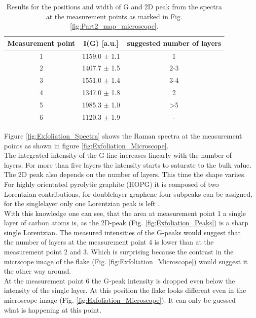\documentclass[12pt,a4paper]{article}
\begin{document}
\begin{table}[h]
\centering
\begin{tabular}{|c|c|c|}
\hline 
Measurement point & I(G) [a.u.] & suggested number of layers \\ 
\hline 
1 & 1159.0 $\pm$ 1.1 & 1 \\ 
\hline 
2 & 1407.7 $\pm$ 1.5 & 2-3 \\ 
\hline 
3 & 1551.0 $\pm$ 1.4 & 3-4 \\ 
\hline 
4 & 1347.0 $\pm$ 1.8 & 2 \\ 
\hline 
5 & 1985.3 $\pm$ 1.0 & >5 \\
\hline 
6 & 1120.3 $\pm$ 1.9 & -  \\ 
\hline 
\end{tabular} 
\caption{Results for the positions and width of G and 2D peak from the spectra at the measurement points as marked in Fig. \ref{fig:Part2_map_microscope}.}
\label{tab:step_G_intensities}
\end{table}

Figure \ref{fig:Exfoliation_Spectra} shows the Raman spectra at the measurement points as shown in figure \ref{fig:Exfoliation_Microscope}. \\
The integrated intensity of the G line increases linearly with the number of layers. For more than five layers the intensity starts to saturate to the bulk value. The 2D peak also depends on the number of layers. This time the shape variies. For highly orientated pyrolytic graphite (HOPG) it is composed of two Lorentzian contributions, for doublelayer graphene four subpeaks can be assigned, for the singlelayer only one Lorentzian peak is left \cite{Lett_2007}. \\
With this knowledge one can see, that the area at measurement point 1 a single layer of carbon atoms is, as the 2D-peak (Fig. \ref{fig:Exfoliation_Peaks}) is a sharp single Lorentzian. The measured intensities of the G-peaks would suggest that the number of layers at the measurement point 4 is lower than at the measurement point 2 and 3. Which is surprising because the contrast in the micrscope image of the flake (Fig. \ref{fig:Exfoliation_Microscope}) would suggest it the other way around. \\
At the measurement point 6 the G-peak intensity is dropped even below the intensity of the single layer. At this position the flake looks different even in the microscope image (Fig. \ref{fig:Exfoliation_Microscope}). It can only be guessed what is happening at this point.
\end{document}
